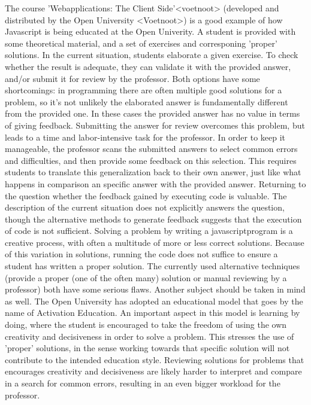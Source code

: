 \documentclass{article}
\begin{document}
\noindent
The course 'Webapplications: The Client Side'<voetnoot> (developed and distributed by the Open University <Voetnoot>) is a good example of how Javascript is being educated at the Open Univerity. A student is provided with some theoretical material, and a set of exercises and corresponing 'proper' solutions. In the current situation, students elaborate a given exercise. To check whether the result is adequate, they can validate it with the provided answer, and/or submit it for review by the professor. Both options have some shortcomings: in programming there are often multiple good solutions for a problem, so it’s not unlikely the elaborated answer is fundamentally different from the provided one. In these cases the provided answer has no value in terms of giving feedback. Submitting the answer for review overcomes this problem, but leads to a time and labor-intensive task for the professor. In order to keep it manageable, the professor scans the submitted answers to select common errors and difficulties, and then provide some feedback on this selection. This requires students to translate this generalization back to their own answer, just like what happens in comparison an specific answer with the provided answer.
\newline
Returning to the question whether the feedback gained by executing code is valuable. The description of the current situation does not explicitly answers the question, though the alternative methods to generate feedback suggests that the execution of code is not sufficient. Solving a problem by writing a javascriptprogram is a creative process, with often a multitude of more or less correct solutions. Because of this variation in solutions, running the code does not suffice to ensure a student has written a proper solution. The currently used alternative techniques (provide a proper (one of the often many) solution or manual reviewing by a professor) both have some serious flaws. 
\newline
Another subject should be taken in mind as well. The Open University has adopted an educational model that goes by the name of Activation Education. An important aspect in this model is learning by doing, where the student is encouraged to take the freedom of using the own creativity and decisiveness in order to solve a problem. This stresses the use of 'proper' solutions, in the sense working towards that specific solution will not contribute to the intended education style. Reviewing solutions for problems that encourages creativity and decisiveness are likely harder to interpret and compare in a search for common errors, resulting in an even bigger workload for the professor. 
\end{document}
